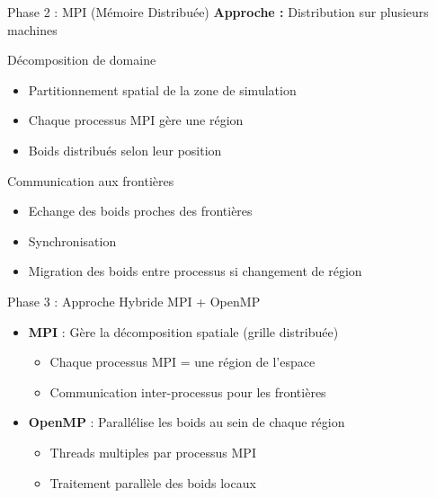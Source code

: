 \documentclass[aspectratio=169]{beamer}
\begin{document}
\begin{frame}{Phase 2 : MPI (Mémoire Distribuée)}
    \textbf{Approche :} Distribution sur plusieurs machines
    \vspace{0.1cm}
    \begin{block}{Décomposition de domaine}
        \begin{itemize}
            \item Partitionnement spatial de la zone de simulation
            \item Chaque processus MPI gère une région
            \item Boids distribués selon leur position
        \end{itemize}
    \end{block}
    \begin{block}{Communication aux frontières}
        \begin{itemize}
            \item Echange des boids proches des frontières
            \item Synchronisation
            \item Migration des boids entre processus si changement de région
        \end{itemize}
    \end{block}
    \vspace{0.1cm}
    \small
\end{frame}

\begin{frame}{Phase 3 : Approche Hybride MPI + OpenMP}
  \begin{itemize}
    \item \textbf{MPI} : Gère la décomposition spatiale (grille distribuée)
    \begin{itemize}
      \item Chaque processus MPI = une région de l'espace
      \item Communication inter-processus pour les frontières
    \end{itemize}
    \item \textbf{OpenMP} : Parallélise les boids au sein de chaque région
    \begin{itemize}
      \item Threads multiples par processus MPI
      \item Traitement parallèle des boids locaux
    \end{itemize}
  \end{itemize}
  
\end{frame}
\end{document}
